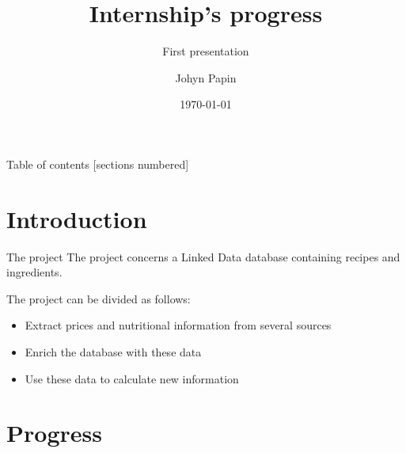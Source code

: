 \documentclass[10pt]{beamer}
\title{Internship's progress}
\subtitle{First presentation}
\date{\today}
\author{Johyn Papin}
\institute{National Institute of Informatics}
\begin{document}
\maketitle

\begin{frame}{Table of contents}
  [sections numbered]
  \tableofcontents[hideallsubsections]
\end{frame}

\section{Introduction}

\begin{frame}[fragile]{The project}
    The project concerns a Linked Data database containing recipes and ingredients.
    
    The project can be divided as follows:
    \begin{itemize}
        \item Extract prices and nutritional information from several sources
        \item Enrich the database with these data
        \item Use these data to calculate new information
    \end{itemize}
\end{frame}

\section{Progress}
\end{document}
